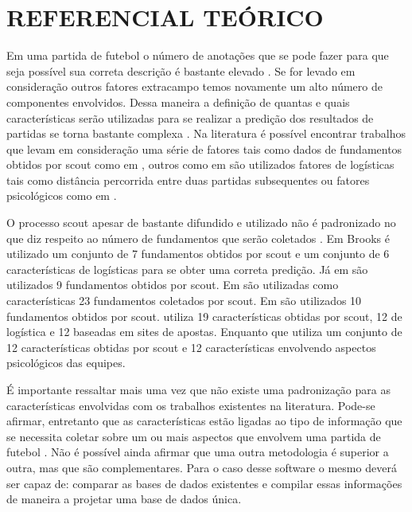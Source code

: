 \section{REFERENCIAL TEÓRICO}
Em uma partida de futebol o número de anotações que se pode fazer para que seja possível sua correta descrição é bastante elevado \cite{Constantinou2013}. Se for levado em consideração outros fatores extracampo temos novamente um alto número de componentes envolvidos. Dessa maneira a definição de quantas e quais características serão utilizadas para se realizar a predição dos resultados de partidas se torna bastante complexa \cite{Tax2015}. Na literatura é possível encontrar trabalhos que levam em consideração uma série de fatores tais como dados de fundamentos obtidos por scout como em , outros como em  são utilizados fatores de logísticas tais como distância percorrida entre duas partidas subsequentes \cite{Tax2015} ou fatores psicológicos como em .

O processo scout apesar de bastante difundido e utilizado não é padronizado no que diz respeito ao número de fundamentos que serão coletados \cite{Pendharkar2000}. Em Brooks \cite{Brooks2016} é utilizado um conjunto de 7 fundamentos obtidos por scout e um conjunto de 6 características de logísticas para se obter uma correta predição. Já em  são utilizados 9 fundamentos obtidos por scout. Em  são utilizadas como características 23 fundamentos coletados por scout. Em  são utilizados 10 fundamentos obtidos por scout.  utiliza 19 características obtidas por scout, 12 de logística e 12 baseadas em sites de apostas. Enquanto que  utiliza um conjunto de 12 características obtidas por scout e 12 características envolvendo aspectos psicológicos das equipes. 
 
É importante ressaltar mais uma vez que não existe uma padronização para as características envolvidas com os trabalhos existentes na literatura. Pode-se afirmar, entretanto que as características estão ligadas ao tipo de informação que se necessita coletar sobre um ou mais aspectos que envolvem uma partida de futebol \cite{Tax2015}. Não é possível ainda afirmar que uma outra metodologia é superior a outra, mas que são complementares. Para o caso desse software o mesmo deverá ser capaz de: comparar as bases de dados existentes e compilar essas informações de maneira a projetar uma base de dados única.